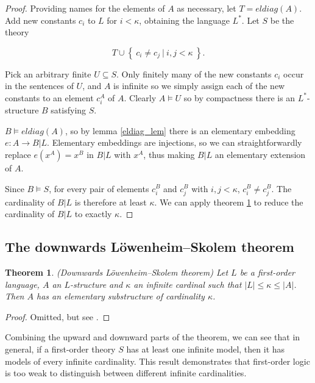 \documentclass[10pt, a4paper, oneside]{article}
\newtheorem{thm}{Theorem}[section]
\theoremstyle{definition}
\theoremstyle{remark}
\theoremstyle{plain}
\theoremstyle{plain}
\begin{document}
\begin{proof}
    Providing names for the elements of $A$ as necessary, let $T = eldiag(A)$.
    Add new constants $c_i$ to $L$ for $i < \kappa$, obtaining the language
    $L^*$. Let $S$ be the theory
    
    \begin{displaymath}
        T \cup \left\{\ c_i \neq c_j\ |\ i, j < \kappa\ \right\}.
    \end{displaymath}
    
    Pick an arbitrary finite $U \subseteq S$. Only finitely many of the new
    constants $c_i$ occur in the sentences of $U$, and $A$ is infinite so we
    simply assign each of the new constants to an element $c^A_i$ of $A$.
    Clearly $A \models U$ so by compactness there is an $L^*$-structure $B$
    satisfying $S$.
    
    $B \models eldiag(A)$, so by lemma \ref{eldiag_lem} there is an elementary
    embedding $e : A \rightarrow B | L$. Elementary embeddings are injections,
    so we can straightforwardly replace $e(x^A) = x^B$ in $B | L$ with $x^A$,
    thus making $B | L$ an elementary extension of $A$.
    
    Since $B \models S$, for every pair of elements $c^B_i$ and $c^B_j$ with
    $i, j < \kappa$, $c^B_i \neq c^B_j$. The cardinality of $B | L$ is therefore
    at least $\kappa$. We can apply theorem \ref{down_lst} to reduce the
    cardinality of $B | L$ to exactly $\kappa$.
\end{proof}

\subsection{The downwards Löwenheim--Skolem theorem}

\begin{thm}
    \label{down_lst}
    (Downwards Löwenheim--Skolem theorem)
    Let $L$ be a first-order language, $A$ an $L$-structure and $\kappa$ an
    infinite cardinal such that $|L| \leq \kappa \leq |A|$. Then $A$ has an
    elementary substructure of cardinality $\kappa$.
\end{thm}

\begin{proof}
    Omitted, but see \citealt[pp. 69--72]{hodges1997}.
\end{proof}

Combining the upward and downward parts of the theorem, we can see that in
general, if a first-order theory $S$ has at least one infinite model, then it
has models of every infinite cardinality. This result demonstrates that
first-order logic is too weak to distinguish between different infinite
cardinalities.
\end{document}
